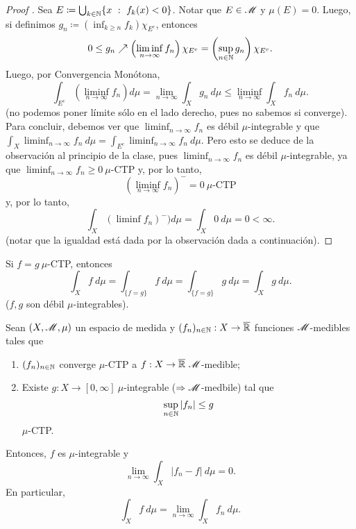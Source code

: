 \begin{proof}[Proof ]
	Sea $E \coloneq \bigcup_{k \in \mathbb{N}} \{x \ : \ f_{k}(x) < 0\}$. Notar que $E \in \mathscr{M}$ y $\mu(E) = 0$. Luego, si definimos $g_{n} \coloneq (\inf_{k \geq n} f_{k}) \chi_{E^{c}}$, entonces 
	\[ 0 \leq g_{n} \nearrow \left(\liminf_{n \to \infty} f_{n}\right) \chi_{E^{c}} = \left(\sup_{n \in \mathbb{N}} g_{n}\right) \chi_{E^{c}}. \]
	Luego, por Convergencia Monótona,
	\[ \int_{E^{c}} \left(\liminf_{n \to \infty} f_{n}\right) d\mu = \lim_{n \to \infty} \int_{X} g_{n} \ d\mu \leq \liminf_{n \to \infty} \int_{X} f_{n} \ d\mu. \]
	(no podemos poner límite sólo en el lado derecho, pues no sabemos si converge). Para concluir, debemos ver que $\liminf_{n \to \infty} f_{n}$ es débil $\mu$-integrable y que $\int_{X} \liminf_{n \to \infty} f_{n} \ d\mu = \int_{E^{c}} \liminf_{n \to \infty} f_{n} \ d\mu$. Pero esto se deduce de la observación al principio de la clase, pues $\liminf_{n \to \infty} f_{n}$ es débil $\mu$-integrable, ya que $\liminf_{n \to \infty} f_{n} \geq 0 \ \mu$-CTP y, por lo tanto, 
	\[ \left(\liminf_{n \to \infty} f_{n}\right)^{-} = 0 \ \mu\text{-CTP} \]
	y, por lo tanto,
	\[ \int_{X} (\liminf f_{n})^{-}) d\mu = \int_{X} 0 \ d\mu = 0 < \infty. \]
	(notar que la igualdad está dada por la observación dada a continuación).
\end{proof}

\begin{remark}
	Si $f = g \ \mu$-CTP, entonces
	\[ \int_{X} f \ d\mu = \int_{\{f=g\}} f \ d\mu = \int_{\{f=g\}} g \ d\mu = \int_{X} g \ d\mu. \]
	($f,g$ son débil $\mu$-integrables).
\end{remark}

\begin{theorem}
	Sean $(X, \mathscr{M}, \mu)$ un espacio de medida y $(f_{n})_{n\in\mathbb{N}} : X \to \overline{\mathbb{R}}$ funciones $\mathscr{M}$-medibles tales que
	\begin{enumerate}
		\item $(f_{n})_{n\in\mathbb{N}}$ converge $\mu$-CTP a $f : X \to \overline{\R} \ \mscr{M}$-medible;

		\item Existe $g : X \to [0,\infty] \ \mu$-integrable ($\Rightarrow \mathscr{M}$-medbile) tal que 
		\[ \sup_{n\in\mathbb{N}} |f_{n}| \leq g \]
		$\mu$-CTP.
	\end{enumerate}
	Entonces, $f$ es $\mu$-integrable y
	\[ \lim_{n \to \infty} \int_{X} |f_{n} - f| \ d\mu = 0. \]
	En particular, 
	\[ \int_{X} f \ d\mu = \lim_{n \to \infty} \int_{X} f_{n} \ d\mu. \]
\end{theorem}

